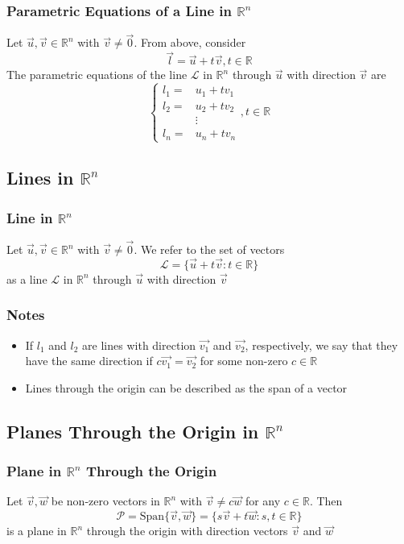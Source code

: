 \documentclass[12pt, letterpaper]{article}
\begin{document}
\subsubsection{Parametric Equations of a Line in $\mathbb{R}^n$}
Let $\vec{u},\vec{v}\in\mathbb{R}^n$ with $\vec{v}\neq\vec{0}$. From above, consider 
\[\vec{l} = \vec{u}+t\vec{v}, t\in\mathbb{R}\]
The parametric equations of the line $\mathcal{L}$ in $\mathbb{R}^n$ through $\vec{u}$ with direction $\vec{v}$ are 
\[\begin{cases}
    l_1 = &u_1 + tv_1 \\
    l_2 = &u_2 + tv_2 \\
    &\vdots \\
    l_n = &u_n + tv_n
\end{cases}, t\in\mathbb{R}\]
\subsection{Lines in $\mathbb{R}^n$}
\subsubsection{Line in $\mathbb{R}^n$}
Let $\vec{u},\vec{v}\in\mathbb{R}^n$ with $\vec{v}\neq\vec{0}$. We refer to the set of vectors 
\[\mathcal{L} = \{\vec{u}+t\vec{v} : t\in\mathbb{R}\}\]
as a line $\mathcal{L}$ in $\mathbb{R}^n$ through $\vec{u}$ with direction $\vec{v}$
\subsubsection*{Notes}
\begin{itemize}
    \item If $l_1$ and $l_2$ are lines with direction $\vec{v_1}$ and $\vec{v_2}$, respectively, we say that they have the same direction if $c\vec{v_1} = \vec{v_2}$ for some non-zero $c\in\mathbb{R}$
    \item Lines through the origin can be described as the span of a vector
\end{itemize}
\subsection{Planes Through the Origin in $\mathbb{R}^n$}
\subsubsection{Plane in $\mathbb{R}^n$ Through the Origin}
Let $\vec{v},\vec{w}$ be non-zero vectors in $\mathbb{R}^n$ with $\vec{v}\neq c\vec{w}$ for any $c\in\mathbb{R}$. Then 
\[\mathcal{P} = \text{Span}\{\vec{v}, \vec{w}\} = \{s\vec{v}+t\vec{w} : s,t\in\mathbb{R}\}\]
is a plane in $\mathbb{R}^n$ through the origin with direction vectors $\vec{v}$ and $\vec{w}$
\end{document}
